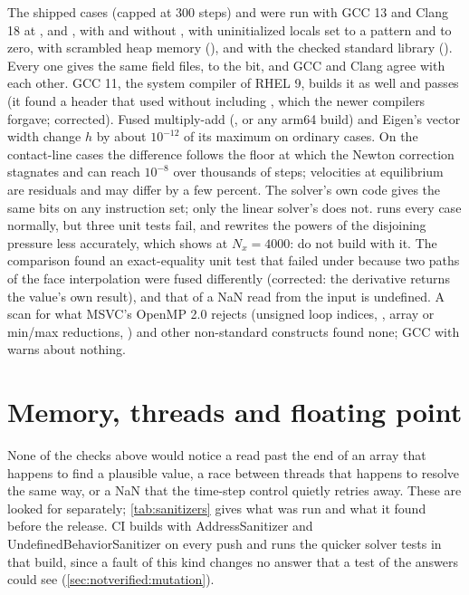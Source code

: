 The shipped cases (capped at 300 steps) and  were run with GCC 13
and Clang 18 at ,  and , with and without
, with uninitialized locals set to a pattern and
to zero, with scrambled heap memory (), and with the
checked standard library (). Every one gives the same
field files, to the bit, and GCC and Clang agree with each other. GCC 11,
the system compiler of RHEL 9, builds it as well and passes 
(it found a header that used  without including
, which the newer compilers forgave; corrected). Fused
multiply-add (, or any arm64 build) and Eigen's vector
width change $h$ by about $10^{-12}$ of its maximum on ordinary cases. On the
contact-line cases the difference follows the floor at which the Newton
correction stagnates and can reach $10^{-8}$ over thousands of steps;
velocities at equilibrium are residuals and may differ by a few percent. The
solver's own code gives the same bits on any instruction set; only the
linear solver's does not.  runs every case normally, but
three unit tests fail, and  rewrites the
powers of the disjoining pressure less accurately, which shows at
$N_x = 4000$: do not build with it. The comparison found an exact-equality
unit test that failed under  because two paths of
the face interpolation were fused differently (corrected: the derivative returns
the value's own result), and that  of a NaN read from the input is
undefined. A scan for what MSVC's OpenMP 2.0 rejects (unsigned loop indices,
, array or min/max reductions, ) and other
non-standard constructs found none; GCC with  warns about nothing.

\section{Memory, threads and floating point}
\label{sec:verification:sanitizers}

None of the checks above would notice a read past the end of an array that
happens to find a plausible value, a race between threads that happens to
resolve the same way, or a NaN that the time-step control quietly retries
away. These are looked for separately; \cref{tab:sanitizers} gives what was run
and what it found before the release. CI builds with AddressSanitizer and
UndefinedBehaviorSanitizer on every push and runs the quicker solver tests
in that build, since a fault of this kind changes no answer that a test of
the answers could see (\cref{sec:notverified:mutation}).

